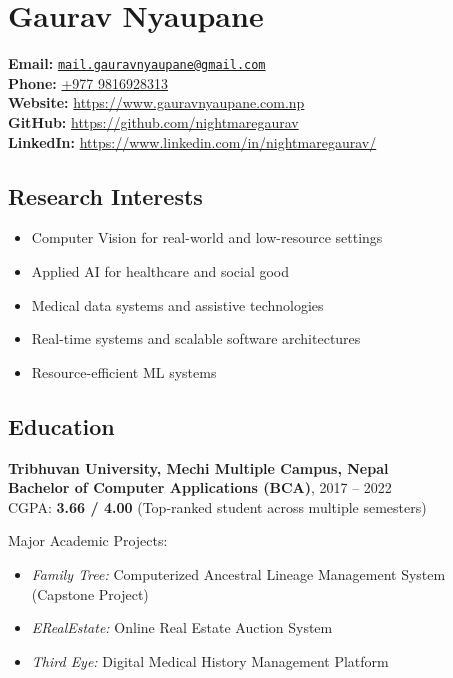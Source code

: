 \hypertarget{gaurav-nyaupane}{%
\section{\texorpdfstring{\textbf{Gaurav
Nyaupane}}{Gaurav Nyaupane}}\label{gaurav-nyaupane}}

\textbf{Email:}
\href{mailto:mail.gauravnyaupane@gmail.com}{\nolinkurl{mail.gauravnyaupane@gmail.com}}\\
\textbf{Phone:} \href{tel:+9779816928313}{+977 9816928313}\\
\textbf{Website:} \url{https://www.gauravnyaupane.com.np}\\
\textbf{GitHub:} \url{https://github.com/nightmaregaurav}\\
\textbf{LinkedIn:} \url{https://www.linkedin.com/in/nightmaregaurav/}

\hypertarget{research-interests}{%
\subsection{\texorpdfstring{\textbf{Research
Interests}}{Research Interests}}\label{research-interests}}

\begin{itemize}
\tightlist
\item
  Computer Vision for real-world and low-resource settings
\item
  Applied AI for healthcare and social good
\item
  Medical data systems and assistive technologies
\item
  Real-time systems and scalable software architectures
\item
  Resource-efficient ML systems
\end{itemize}

\hypertarget{education}{%
\subsection{\texorpdfstring{\textbf{Education}}{Education}}\label{education}}

\textbf{Tribhuvan University, Mechi Multiple Campus, Nepal}\\
\textbf{Bachelor of Computer Applications (BCA)}, 2017 -- 2022\\
CGPA: \textbf{3.66 / 4.00} (Top-ranked student across multiple
semesters)

Major Academic Projects:

\begin{itemize}
\tightlist
\item
  \emph{Family Tree:} Computerized Ancestral Lineage Management System
  (Capstone Project)
\item
  \emph{ERealEstate:} Online Real Estate Auction System
\item
  \emph{Third Eye:} Digital Medical History Management Platform
\end{itemize}

